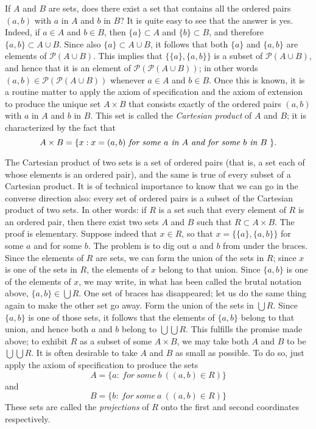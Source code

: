 If $A$ and $B$ are sets, does there exist a set that contains all the ordered pairs $(a,b)$ with $a$ in $A$ and $b$ in $B$? It is quite easy to see that the answer is yes. Indeed, if $a \in A$ and $b \in B$, then $ \{ a \} \subset A$ and $ \{ b \}  \subset B$, and therefore $ \{ a, b \} \subset A \cup B$. Since also $ \{ a \} \subset A \cup B$, it follows that both $ \{ a \}$ and $ \{ a, b \} $ are elements of $ \mathcal{P} (A \cup B)$. This implies that $ \{ \{ a \}, \{ a,b \} \} $ is a subset of $ \mathcal{P} (A \cup B) $, and hence that it is an element of $ \mathcal{P} ( \mathcal{P} (A \cup B))$; in other words $(a, b) \in \mathcal{P} ( \mathcal{P} (A \cup B))$ whenever $ a \in  A$ and $ b \in B$. Once this is known, it is a routine matter to apply the axiom of specification and the axiom of extension to produce the unique set $A \times B$ that consists exactly of the ordered pairs $(a, b)$ with $a$ in $A$ and $b$ in $B$. This set is called the \textit{Cartesian product} of $A$ and $B$; it is characterized by the fact that 
\begin{equation*}
A \times B = \{ x: x = (a,b) \text{ \textit{for some $a$ in $A$ and for some $b$ in $B$} } \}.
\end{equation*}

The Cartesian product of two sets is a set of ordered pairs (that is, a set each of whose elements is an ordered pair), and the same is true of every subset of a Cartesian product. It is of technical importance to know that we can go in the converse direction also: every set of ordered pairs is a subset of the Cartesian product of two sets. In other words: if $R$ is a set such that every element of $R$ is an ordered pair, then there exist two sets $A$ and $B$ such that $R \subset A \times B $. The proof is elementary. Suppose indeed that $ x \in R$, so that $ x = \{ \{ a \}, \{ a, b \} \}$ for some $a$ and for some $b$. The problem is to dig out $a$ and $b$ from under the braces. Since the elements of $R$ are sets, we can form the union of the sets in $R$; since $x$ is one of the sets in $R$, the elements of $x$ belong to that union. Since $\{ a,b \}$ is one of the elements of $x$, we may write, in what has been called the brutal notation above, $ \{a,b \} \in \bigcup R$. One set of braces has disappeared; let us do the same thing again to make the other set go away. Form the union of the sets in $ \bigcup R$. Since $ \{ a, b \}$ is one of those sets, it follows that the elements of $ \{ a,b \}$ belong to that union, and hence both $a$ and $b$ belong to $ \bigcup \bigcup R$. This fulfills the promise made above; to exhibit $R$ as a subset of some $A \times B$, we may take both $A$ and $B$ to be $ \bigcup \bigcup R$. It is often desirable to take $A$ and $B$ as small as possible. To do so, just apply the axiom of specification to produce the sets
\begin{equation*}
A = \{ a : \: for \: some \: b\ ((a,b) \in R) \}
\end{equation*}
and 
\begin{equation*}
B = \{ b : \: for \: some \: a\ ((a,b) \in R) \}
\end{equation*}
These sets are called the \textit{projections} of $R$ onto the first and second coordinates respectively.

